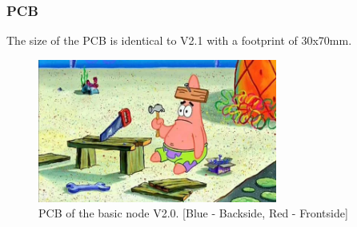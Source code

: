     \subsubsection{PCB}
        The size of the PCB is identical to V2.1 with a footprint of 30x70mm.
        
    \begin{figure}[H]
        \centering
        \includegraphics[width=0.7\textwidth]{assets/HW/TBD.png}
        \caption{PCB of the basic node V2.0. [Blue - Backside, Red - Frontside]}
    \end{figure}
